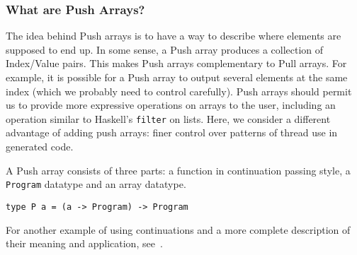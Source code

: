 




\subsubsection {What are Push Arrays?} 

The idea behind Push arrays is to have a way to describe where 
elements are supposed to end up. In some sense, a Push array produces 
a collection of Index/Value pairs. %
This makes Push arrays complementary to Pull arrays. For example, it 
is possible for a Push array to output several elements at the same index 
(which we probably need to control carefully). Push arrays should permit 
us to provide more expressive operations on arrays to the user, including 
an operation similar to Haskell's {\tt filter} on lists. Here, we consider 
a different advantage of adding push arrays: finer control over patterns of 
thread use in generated code.



A Push array consists of three parts: a function in continuation passing style, 
a {\tt Program} datatype and an array datatype. 

\begin{codesize}
\begin{verbatim}
type P a = (a -> Program) -> Program 
\end{verbatim}
\end{codesize}

\noindent
For another example of using continuations and a more complete
description of their meaning and application, see~. 

